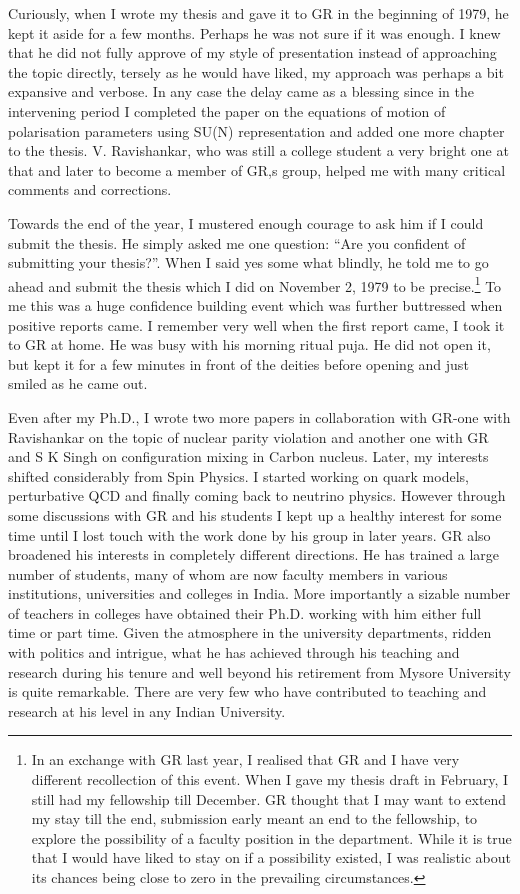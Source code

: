 Curiously, when I wrote my thesis and gave it to GR in the beginning of 1979, he kept it aside for a few months. Perhaps he was not sure if it was enough. I knew that he did not fully approve of my style of presentation instead of approaching the topic directly, tersely as he would have liked, my approach was perhaps a bit expansive and verbose. In any case the delay came as a blessing since in the intervening period I completed the paper on the equations of motion of polarisation parameters using SU(N) representation and added one more chapter to the thesis. V. Ravishankar, who was still a college student a very bright one at that and later to become a member of GR,s group, helped me with many critical comments and corrections.

Towards the end of the year, I mustered enough courage to ask him if I could submit the thesis. He simply asked me one question: “Are you confident of submitting your thesis?”. When I said yes some what blindly, he told me to go ahead and submit the thesis which I did on November 2, 1979 to be precise.\footnote{In an exchange with GR last year, I realised that GR and I have very different recollection of this event. When I gave my thesis draft in February, I still had my fellowship till December. GR thought that I may want to extend my stay till the end, submission early meant an end to the fellowship, to explore the possibility of a faculty position in the department. While it is true that I would have liked to stay on if a possibility existed, I was realistic about its chances being close to zero in the prevailing circumstances.} To me this was a huge confidence building event which was further buttressed when positive reports came. I remember very well when the first report came, I took it to GR at home. He was busy with his morning ritual puja. He did not open it, but kept it for a few minutes in front of the deities before opening and just smiled as he came out. 

Even after my Ph.D., I wrote two more papers in collaboration with GR-one with Ravishankar on the topic of nuclear parity violation and another one with GR and S K Singh on configuration mixing in Carbon nucleus. Later, my interests shifted considerably from Spin Physics. I started working on quark models, perturbative QCD and finally coming back to neutrino physics. However through some discussions with GR and his students I kept up a healthy interest for some time until I lost touch with the work done by his group in later years. GR also broadened his interests in completely different directions. He has trained a large number of students, many of whom are now faculty members in various institutions, universities and colleges in India. More importantly a sizable number of teachers in colleges have obtained their Ph.D. working with him either full time or part time. Given the atmosphere in the university departments, ridden with politics and intrigue, what he has achieved through his teaching and research during his tenure and well beyond his retirement from Mysore University is quite remarkable. There are very few who have contributed to teaching and research at his level in any Indian University.

